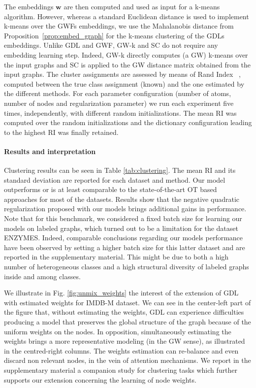 \documentclass{article}
\def\vw{{\bm{w}}}
\begin{document}
	The embeddings $\vw$ are then computed and used as input for a
	k-means algorithm. However, whereas a standard Euclidean distance is used to
	implement k-means over the GWFs embeddings, we use the Mahalanobis
	distance from Proposition~\ref{prop:embed_graph} for the k-means clustering of the GDLs embeddings. Unlike
	GDL and GWF, GW-k and SC do not require any embedding learning step. Indeed,
	GW-k directly computes (a GW) k-means over the input graphs and SC is applied to
	the  GW distance matrix obtained from the input graphs. The cluster assignments
	are assessed by means of Rand Index ~\citep[RI,][]{rand1971objective}, computed
	between the true class assignment (known) and the one estimated by the different
	methods. For each parameter configuration (number of atoms, number of nodes and
	regularization parameter)
	we run each experiment five times, independently, with different random initializations. The mean RI was computed over the random
	initializations and the dictionary configuration leading to the highest RI was
	finally retained.
	
	\paragraph{Results and interpretation} Clustering results can be seen in Table
	\ref{tab:clustering}. The mean RI and its standard deviation are reported for each dataset and method.
	Our model outperforms or is at least comparable to the state-of-the-art OT based approaches for most of the datasets. Results show that the negative quadratic regularization proposed with our models brings additional gains in performance. Note that for this benchmark, we considered a fixed batch size for learning our models on labeled graphs, which turned out to be a limitation for the dataset ENZYMES. Indeed, comparable conclusions regarding our models performance have been observed by setting a higher batch size for this latter dataset and are reported in the supplementary material.
	This might be due to both a high number of heterogeneous classes and a high structural diversity of labeled graphs inside and among classes.
	
	We illustrate in Fig. \ref{fig:unmix_weights} the interest of the extension of
	GDL with estimated weights for IMDB-M dataset. We can see in the center-left
	part of the figure that, without estimating the weights, GDL can experience
	difficulties producing a model that preserves the global structure of the graph
	because of the uniform weights on the nodes. In opposition, simultaneously
	estimating the weights brings a more representative modeling (in the GW sense),
	as illustrated in the centred-right columns. The weights estimation can
	re-balance and even discard non relevant nodes, in the vein of attention mechanisms. We report in the supplementary material a companion study for clustering tasks which further supports our extension concerning the learning of node weights.
	
\end{document}
